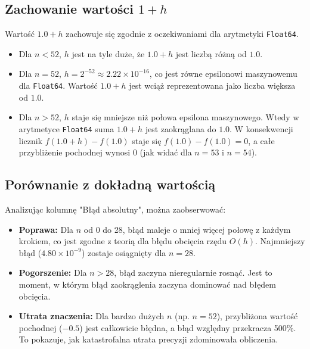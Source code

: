 \documentclass[a4paper,12pt]{article}
\begin{document}
\subsection*{Zachowanie wartości \(1+h\)}
Wartość \(1.0 + h\) zachowuje się zgodnie z oczekiwaniami dla arytmetyki \texttt{Float64}.
\begin{itemize}
    \item Dla \(n < 52\), \(h\) jest na tyle duże, że \(1.0 + h\) jest liczbą różną od \(1.0\).
    \item Dla \(n = 52\), \(h = 2^{-52} \approx 2.22 \times 10^{-16}\), co jest równe epsilonowi maszynowemu dla \texttt{Float64}. Wartość \(1.0 + h\) jest wciąż reprezentowana jako liczba większa od \(1.0\).
    \item Dla \(n > 52\), \(h\) staje się mniejsze niż połowa epsilona maszynowego. Wtedy w arytmetyce \texttt{Float64} suma \(1.0 + h\) jest zaokrąglana do \(1.0\). W konsekwencji licznik \(f(1.0 + h) - f(1.0)\) staje się \(f(1.0) - f(1.0) = 0\), a całe przybliżenie pochodnej wynosi 0 (jak widać dla \(n=53\) i \(n=54\)).
\end{itemize}

\subsection*{Porównanie z dokładną wartością}
Analizując kolumnę "Błąd absolutny", można zaobserwować:
\begin{itemize}
    \item \textbf{Poprawa:} Dla \(n\) od 0 do 28, błąd maleje o mniej więcej połowę z każdym krokiem, co jest zgodne z teorią dla błędu obcięcia rzędu \(O(h)\). Najmniejszy błąd (\(4.80 \times 10^{-9}\)) zostaje osiągnięty dla \(n=28\).
    \item \textbf{Pogorszenie:} Dla \(n > 28\), błąd zaczyna nieregularnie rosnąć. Jest to moment, w którym błąd zaokrąglenia zaczyna dominować nad błędem obcięcia.
    \item \textbf{Utrata znaczenia:} Dla bardzo dużych \(n\) (np. \(n=52\)), przybliżona wartość pochodnej (\(-0.5\)) jest całkowicie błędna, a błąd względny przekracza 500\%. To pokazuje, jak katastrofalna utrata precyzji zdominowała obliczenia.
\end{itemize}
\end{document}
